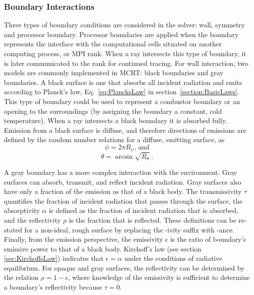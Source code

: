 \subsubsection{Boundary Interactions}
Three types of boundary conditions are considered in the solver: wall, symmetry and processor boundary. Processor boundaries are applied when the boundary represents the interface with the computational cells situated on another computing process, or MPI rank. When a ray intersects this type of boundary, it is later communicated to the rank for continued tracing.
For wall interaction, two models are commonly implemented in MCRT: black boundaries and gray boundaries.
A black surface is one that absorbs all incident radiation and emits according to Planck's law, Eq.~\ref{eq:PlancksLaw} in section~\ref{section:BasicLaws}. 
This type of boundary could be used to represent a combustor boundary or an opening to the surroundings (by assigning the boundary a constant, cold temperature). 
When a ray intersects a black boundary it is absorbed fully. Emission from a black surface is diffuse, and therefore directions of emissions are defined by the random number relations for a diffuse, emitting surface, as
\begin{equation}
    \psi{}=2\pi{}R_\psi\text{, and}
    \label{eq:diffuse_emission_psi}
\end{equation}
\begin{equation}
    \theta = \arcsin{\sqrt{R_\theta}}~.
    \label{eq:diffuse_emission_theta}
\end{equation}

A gray boundary has a more complex interaction with the environment. Gray surfaces can absorb, transmit, and reflect incident radiation. Gray surfaces also have only a fraction of the emission as that of a black body.
The transmissivity $\tau{}$ quantifies the fraction of incident radiation that passes through the surface, the absorptivity $\alpha$ is defined as the fraction of incident radiation that is absorbed, and the reflectivity $\rho$ is the fraction that is reflected. These definitions can be re-stated for a non-ideal, rough surface by replacing the -ivity suffix with -ance. 
Finally, from the emission perspective, the emissivity $\epsilon$ is the ratio of boundary's emissive power to that of a black body.  Kirchoff's law (see section \ref{sec:KirchoffsLaw}) indicates that $\epsilon{}=\alpha{}$ under the conditions of radiative equilibrium.
For opaque and gray surfaces, the reflectivity can be determined by the relation $\rho{}=1-\epsilon$, where knowledge of the emissivity is sufficient to determine a boundary's reflectivity because $\tau{}=0$.

